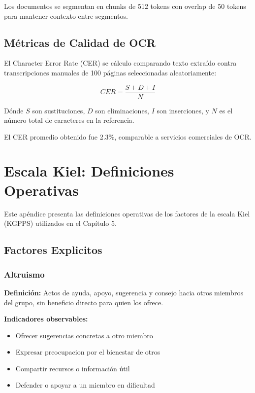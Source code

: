 \documentclass[12pt,a4paper,twoside]{book}
\begin{document}
Los documentos se segmentan en chunks de 512 tokens con overlap de 50 tokens para mantener contexto entre segmentos.

\section{Métricas de Calidad de OCR}

El Character Error Rate (CER) se cálculo comparando texto extraído contra transcripciones manuales de 100 páginas seleccionadas aleatoriamente:

\begin{equation}
CER = \frac{S + D + I}{N}
\end{equation}

Dónde $S$ son sustituciones, $D$ son eliminaciones, $I$ son inserciones, y $N$ es el número total de caracteres en la referencia.

El CER promedio obtenido fue 2.3\%, comparable a servicios comerciales de OCR.

\chapter{Escala Kiel: Definiciones Operativas}

Este apéndice presenta las definiciones operativas de los factores de la escala Kiel (KGPPS) utilizados en el Capítulo 5.

\section{Factores Explicitos}

\subsection{Altruismo}

\textbf{Definición:} Actos de ayuda, apoyo, sugerencia y consejo hacia otros miembros del grupo, sin beneficio directo para quien los ofrece.

\textbf{Indicadores observables:}
\begin{itemize}
    \item Ofrecer sugerencias concretas a otro miembro
    \item Expresar preocupacion por el bienestar de otros
    \item Compartir recursos o información útil
    \item Defender o apoyar a un miembro en dificultad
\end{itemize}
\end{document}
